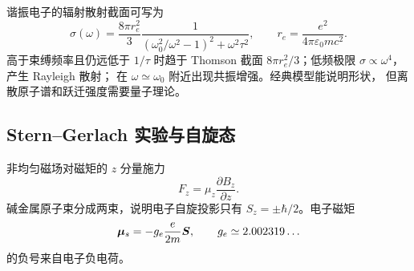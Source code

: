 谐振电子的辐射散射截面可写为
\[
 \sigma(\omega)=\frac{8\pi r_e^2}{3}
 \frac1{(\omega_0^2/\omega^2-1)^2+\omega^2\tau^2},
\qquad
 r_e=\frac{e^2}{4\pi\varepsilon_0mc^2}.
\]
高于束缚频率且仍远低于 $1/\tau$ 时趋于 Thomson 截面
$8\pi r_e^2/3$；低频极限 $\sigma\propto\omega^4$，产生 Rayleigh 散射；
在 $\omega\simeq\omega_0$ 附近出现共振增强。经典模型能说明形状，
但离散原子谱和跃迁强度需要量子理论。

\subsection{Stern--Gerlach 实验与自旋态}

非均匀磁场对磁矩的 $z$ 分量施力
\[
 F_z=\mu_z\frac{\partial B_z}{\partial z}.
\]
碱金属原子束分成两束，说明电子自旋投影只有
$S_z=\pm\hbar/2$。电子磁矩
\[
 \bm{\mu}_s=-g_e\frac{e}{2m}\bm{S},\qquad
 g_e\simeq2.002319\ldots
\]
的负号来自电子负电荷。

